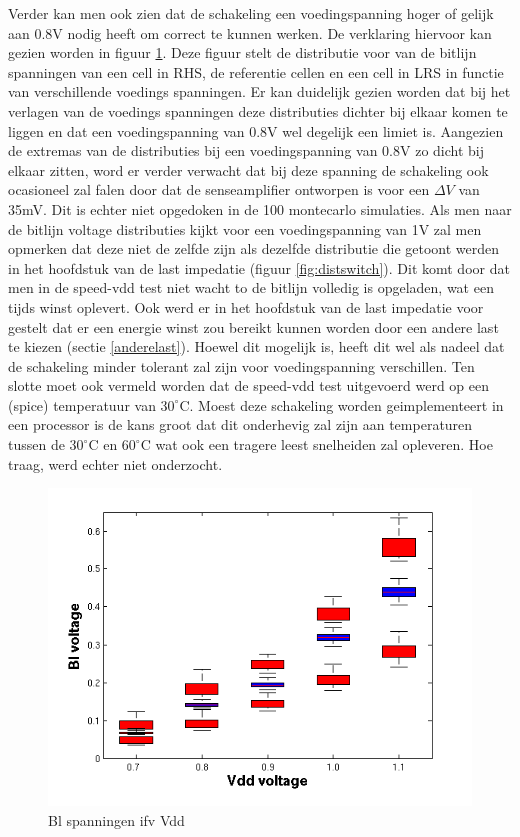 Verder kan men ook zien dat de schakeling een voedingspanning hoger of gelijk aan 0.8V nodig heeft om correct te kunnen werken. De verklaring hiervoor kan gezien worden in figuur \ref{fig:vblvdd}. Deze figuur stelt de distributie voor van de bitlijn spanningen van een cell in RHS, de referentie cellen en een cell in LRS in functie van verschillende voedings spanningen. Er kan duidelijk gezien worden dat bij het verlagen van de voedings spanningen deze distributies dichter bij elkaar komen te liggen en dat een voedingspanning van 0.8V wel degelijk een limiet is. Aangezien de extremas van de distributies bij een voedingspanning van 0.8V zo dicht bij elkaar zitten, word er verder verwacht dat bij deze spanning de schakeling ook ocasioneel zal falen door dat de senseamplifier ontworpen is voor een $\Delta V$ van 35mV. Dit is echter niet opgedoken in de 100 montecarlo simulaties.
Als men naar de bitlijn voltage distributies kijkt voor een voedingspanning van 1V zal men opmerken dat deze niet de zelfde zijn als dezelfde distributie die getoont werden in het hoofdstuk van de last impedatie (figuur \ref{fig:distswitch}). Dit komt door dat men in de speed-vdd test niet wacht to de bitlijn volledig is opgeladen, wat een tijds winst oplevert. Ook werd er in het hoofdstuk van de last impedatie voor gestelt dat er een energie winst zou bereikt kunnen worden door een andere last te kiezen (sectie \ref{anderelast}). Hoewel dit mogelijk is, heeft dit wel als nadeel dat de schakeling minder tolerant zal zijn voor voedingspanning verschillen. Ten slotte moet ook vermeld worden dat de speed-vdd test uitgevoerd werd op een (spice) temperatuur van $30^{\circ}\mathrm{C}$. Moest deze schakeling worden geimplementeert in een processor is de kans groot dat dit onderhevig zal zijn aan temperaturen tussen de $30^{\circ}\mathrm{C}$ en $60^{\circ}\mathrm{C}$ wat ook een tragere leest snelheiden zal opleveren. Hoe traag, werd echter niet onderzocht.

\begin{figure}[!ht]
  \centering
  \includegraphics[scale=0.8]{../fig/hfdst-final-vddbl.png}
  \caption{Bl spanningen ifv Vdd}
  \label{fig:vblvdd}
\end{figure}

